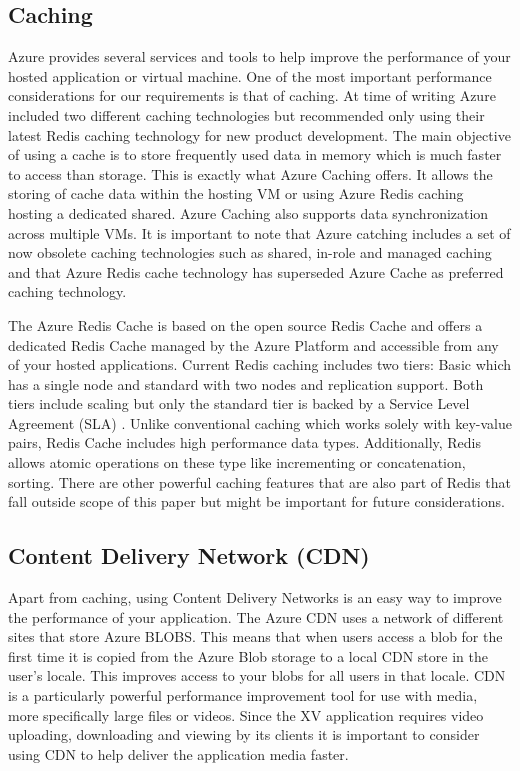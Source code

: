 \subsection{Caching}

Azure provides several services and tools to help improve the performance of your hosted application or virtual machine. One of the most important performance considerations for our requirements is that of caching. At time of writing Azure included two different caching technologies but recommended only using their latest Redis caching technology for new product development. The main objective of using a cache is to store frequently used data in memory which is much faster to access than storage. This is exactly what Azure Caching offers. It allows the storing of cache data within the hosting VM or using Azure Redis caching hosting a dedicated shared. Azure Caching also supports data synchronization across multiple VMs. It is important to note that Azure catching includes a set of now obsolete caching technologies such as shared, in-role and managed caching \cite{Microsoft_Corporation_undated-ej} and that Azure Redis cache  technology has superseded Azure Cache as preferred caching technology.

The Azure Redis Cache is based on the open source Redis Cache and offers a dedicated Redis Cache managed by the Azure Platform and accessible from any of your hosted applications. Current Redis caching includes two tiers: Basic which has a single node and standard with two nodes and replication support. Both tiers include scaling but only the standard tier is backed by a Service Level Agreement (SLA) \cite{Azure_Redis}. Unlike conventional caching which works solely with key-value pairs, Redis Cache includes high performance data types. Additionally, Redis allows atomic operations on these type like incrementing or concatenation, sorting. There are other powerful caching features that are also part of Redis that fall outside scope of this paper but might be important for future considerations.

\subsection{Content Delivery Network (CDN)}

Apart from caching, using Content Delivery Networks is an easy way to improve the performance of your application. The Azure CDN uses a network of different sites that store Azure BLOBS. This means that when users access a blob for the first time it is copied from the Azure Blob storage to a local CDN store in the user's locale. This improves access to your blobs for all users in that locale. CDN is a particularly powerful performance improvement tool for use with media, more specifically large files or videos. Since the XV application requires video uploading, downloading and viewing by its clients it is important to consider using CDN to help deliver the application media faster.

